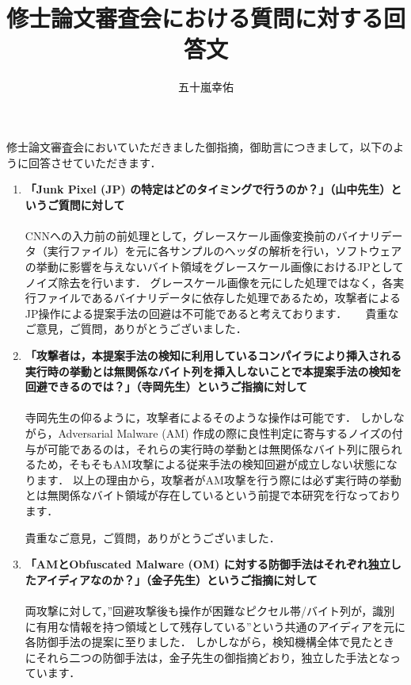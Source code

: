 \documentclass[11pt, a4paper]{article}
\title{修士論文審査会における質問に対する回答文}
\author{五十嵐幸佑}
\begin{document}
\maketitle
修士論文審査会においていただきました御指摘，御助言につきまして，以下のように回答させていただきます．

\begin{enumerate} 
	\item \textbf{「Junk Pixel (JP) の特定はどのタイミングで行うのか？」（山中先生）というご質問に対して}\\ \\
	CNNへの入力前の前処理として，グレースケール画像変換前のバイナリデータ（実行ファイル）を元に各サンプルのヘッダの解析を行い，ソフトウェアの挙動に影響を与えないバイト領域をグレースケール画像におけるJPとしてノイズ除去を行います．
	グレースケール画像を元にした処理ではなく，各実行ファイルであるバイナリデータに依存した処理であるため，攻撃者によるJP操作による提案手法の回避は不可能であると考えております．
    　  
	貴重なご意見，ご質問，ありがとうございました．
  \vspace{10mm}

  \item \textbf{「攻撃者は，本提案手法の検知に利用しているコンパイラにより挿入される実行時の挙動とは無関係なバイト列を挿入しないことで本提案手法の検知を回避できるのでは？」（寺岡先生）というご指摘に対して}\\ \\
	寺岡先生の仰るように，攻撃者によるそのような操作は可能です．
	しかしながら，Adversarial Malware (AM) 作成の際に良性判定に寄与するノイズの付与が可能であるのは，それらの実行時の挙動とは無関係なバイト列に限られるため，そもそもAM攻撃による従来手法の検知回避が成立しない状態になります．
	以上の理由から，攻撃者がAM攻撃を行う際には必ず実行時の挙動とは無関係なバイト領域が存在しているという前提で本研究を行なっております．
    
	貴重なご意見，ご質問，ありがとうございました．
  \vspace{10mm}

  \item \textbf{「AMとObfuscated Malware (OM) に対する防御手法はそれぞれ独立したアイディアなのか？」（金子先生）というご指摘に対して}\\ \\
    	両攻撃に対して，”回避攻撃後も操作が困難なピクセル帯/バイト列が，識別に有用な情報を持つ領域として残存している”という共通のアイディアを元に各防御手法の提案に至りました．
	しかしながら，検知機構全体で見たときにそれら二つの防御手法は，金子先生の御指摘どおり，独立した手法となっています．


\end{enumerate}
\end{document}
